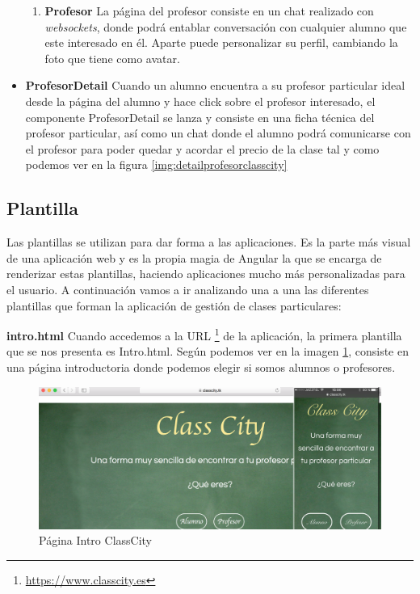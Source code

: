 \begin{itemize}
\begin{enumerate}
\item \textbf{Profesor } La página del profesor consiste en un chat realizado con \textit{websockets}, donde podrá entablar conversación con cualquier alumno que este interesado en él. Aparte puede personalizar su perfil, cambiando la foto que tiene como avatar.
\end{enumerate}

\item \textbf{ProfesorDetail} Cuando un alumno encuentra a su profesor particular ideal desde la página del alumno y hace click sobre el profesor interesado, el componente ProfesorDetail se lanza y consiste en una ficha técnica del profesor particular, así como un chat donde el alumno podrá comunicarse con el profesor para poder quedar y acordar el precio de la clase tal y como podemos ver en la figura \ref{img:detailprofesorclasscity}

\end{itemize}

\subsection{Plantilla }

Las plantillas se utilizan para dar forma a las aplicaciones. Es la parte más visual de una aplicación web y es la propia magia de Angular la que se encarga de renderizar estas plantillas, haciendo aplicaciones mucho más personalizadas para el usuario. A continuación vamos a ir analizando una a una las diferentes plantillas que forman la aplicación de gestión de clases particulares:

\textbf {intro.html} Cuando accedemos a la URL \footnote{\url{https://www.classcity.es}} de la aplicación, la primera plantilla que se nos presenta es Intro.html. Según podemos ver en la imagen  \ref{img:introclasscity}, consiste en una página introductoria donde podemos elegir si somos alumnos o profesores.

\begin{figure}[!h]
    \centering
    \includegraphics[width=140mm]{img/templates/intro.png}
    \caption{Página Intro ClassCity}
    \label{img:introclasscity}
\end{figure}


